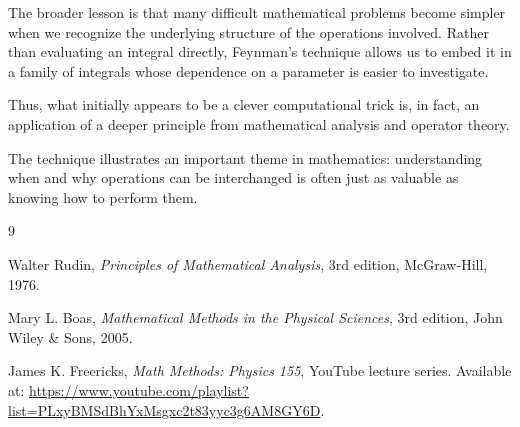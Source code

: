 \documentclass[11pt,a4paper]{article}
\theoremstyle{definition}
\theoremstyle{remark}
\begin{document}
The broader lesson is that
many difficult mathematical
problems become simpler when
we recognize the underlying
structure of the operations
involved. Rather than
evaluating an integral
directly, Feynman's technique
allows us to embed it in
a family of integrals
whose dependence on a
parameter is easier
to investigate.

Thus, what initially appears
to be a clever computational
trick is, in fact, an
application of a deeper
principle from mathematical
analysis and operator theory.

The technique illustrates
an important theme in
mathematics: understanding
when and why operations
can be interchanged is
often just as valuable
as knowing how to
perform them.


\begin{thebibliography}{9}



Walter Rudin,
\textit{Principles of Mathematical Analysis},
3rd edition,
McGraw-Hill, 1976.


Mary L. Boas,
\textit{Mathematical Methods in the Physical Sciences},
3rd edition,
John Wiley \& Sons, 2005.


James K. Freericks,
\textit{Math Methods: Physics 155},
YouTube lecture series.
Available at:
\url{https://www.youtube.com/playlist?list=PLxyBMSdBhYxMsgxc2t83yyc3g6AM8GY6D}.


\end{thebibliography}
\end{document}
